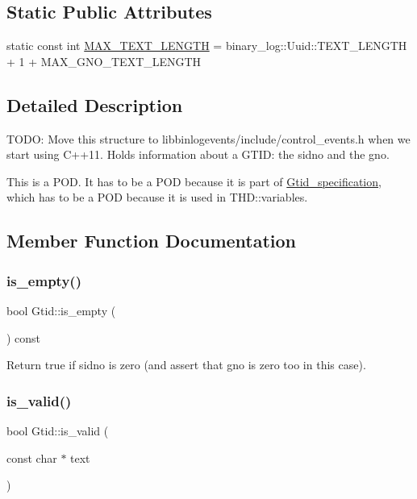 \subsection*{Static Public Attributes}
\begin{DoxyCompactItemize}
\item 
static const int \mbox{\hyperlink{structGtid_a16358c79f9923fb0a0aaab4d71e86fc0}{M\+A\+X\+\_\+\+T\+E\+X\+T\+\_\+\+L\+E\+N\+G\+TH}} = binary\+\_\+log\+::\+Uuid\+::\+T\+E\+X\+T\+\_\+\+L\+E\+N\+G\+TH + 1 + M\+A\+X\+\_\+\+G\+N\+O\+\_\+\+T\+E\+X\+T\+\_\+\+L\+E\+N\+G\+TH
\end{DoxyCompactItemize}


\subsection{Detailed Description}
T\+O\+DO\+: Move this structure to libbinlogevents/include/control\+\_\+events.\+h when we start using C++11. Holds information about a G\+T\+ID\+: the sidno and the gno.

This is a P\+OD. It has to be a P\+OD because it is part of \mbox{\hyperlink{structGtid__specification}{Gtid\+\_\+specification}}, which has to be a P\+OD because it is used in T\+H\+D\+::variables. 

\subsection{Member Function Documentation}
\mbox{\label{structGtid_a36b73175b879388152c746453ee2b87a}} 
\subsubsection{\texorpdfstring{is\+\_\+empty()}{is\_empty()}}
{\footnotesize\ttfamily bool Gtid\+::is\+\_\+empty (\begin{DoxyParamCaption}{ }\end{DoxyParamCaption}) const\hspace{0.3cm}{\ttfamily [inline]}}

Return true if sidno is zero (and assert that gno is zero too in this case). \mbox{\label{structGtid_afaec04645d158bc4ad9eaa2199cc6951}} 
\subsubsection{\texorpdfstring{is\+\_\+valid()}{is\_valid()}}
{\footnotesize\ttfamily bool Gtid\+::is\+\_\+valid (\begin{DoxyParamCaption}\item[{const char $\ast$}]{text }\end{DoxyParamCaption})\hspace{0.3cm}{\ttfamily [static]}}

